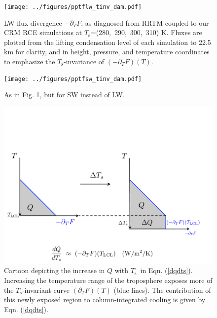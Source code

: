 \documentclass[10pt]{article}
\newcommand{\eqnref}[1]{(\ref{#1})}
\newcommand{\ppt}{\ensuremath{\partial_T}}
\newcommand{\Ts}{\ensuremath{T_\mathrm{s}}}
\begin{document}
\begin{figure}[h]
	\begin{center}
			\texttt{[image: ../figures/pptflw\_tinv\_dam.pdf]}
		\caption{LW flux divergence  $-\ppt F$, as diagnosed from RRTM coupled to our CRM RCE simulations at \Ts=(280,\ 290,\ 300,\ 310) K. Fluxes are plotted from the lifting condensation level of each simulation to 22.5 km for clarity, and  in height, pressure, and temperature coordinates to emphasize the \Ts-invariance of  $(-\ppt F)(T)$.
		\label{pptflw_tinv_dam}
		}
	\end{center}
\end{figure}

\begin{figure}[h]
	\begin{center}
			\texttt{[image: ../figures/pptfsw\_tinv\_dam.pdf]}
		\caption{As in Fig. \ref{pptflw_tinv_dam}, but for SW instead of LW.
		\label{pptfsw_tinv_dam}
		}
	\end{center}
\end{figure}

\begin{figure}[h]
	\begin{center}
			\includegraphics[scale=0.65,trim=0cm 0cm 0cm 5cm,clip=true]{../figures/dqdts_cartoon.pdf}
		\caption{Cartoon depicting the increase in $Q$ with \Ts\ in Eqn. \eqnref{dqdts}. Increasing the temperature range of the troposphere  exposes more of the \Ts-invariant curve $(\ppt F)(T)$ (blue lines). The contribution  of this newly exposed region to column-integrated cooling is given by Eqn. \eqnref{dqdts}.
		\label{dqdts_cartoon}
		}
	\end{center}
\end{figure}
\end{document}
